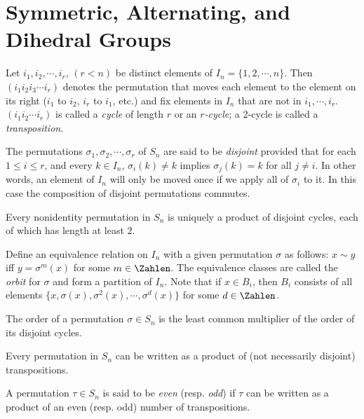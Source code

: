 \section{Symmetric, Alternating, and Dihedral Groups}
\begin{Definition}
	Let $ i_1,i_2,\cdots, i_r $, $ (r<n) $ be distinct elements of $ I_n=\{1,2,\cdots,n \} $. Then $ (i_1 i_2 i_3 \cdots i_r) $ denotes the permutation that moves each element to the element on its right ($ i_1 $ to $ i_2 $, $ i_r $ to $ i_1 $, etc.) and fix elements in $ I_n $ that are not in $ i_1 ,\cdots,i_r$. $ (i_1i_2 \cdots i_r) $ is called a \textit{cycle} of length $ r $ or an \textit{$ r $-cycle}; a $ 2 $-cycle is called a \textit{transposition}.
\end{Definition}
\begin{Definition}
	The permutations $ \sigma_1,\sigma_2,\cdots,\sigma_r $ of $ S_n $ are said to be \textit{disjoint} provided that for each $ 1\leqslant i \leqslant r $, and every $ k\in I_n $, $ \sigma_i(k)\neq k $ implies $ \sigma_j(k)=k $ for all $ j \neq i $. In other words, an element of $ I_n $ will only be moved once if we apply all of $ \sigma_i$ to it. In this case the composition of disjoint permutations commutes.
\end{Definition}
\begin{Theorem}
	Every nonidentity permutation in $ S_n $ is uniquely a product of disjoint cycles, each of which has length at least $ 2 $.
\end{Theorem}
\begin{Definition}
	Define an equivalence relation on $ I_n $ with a given permutation $ \sigma $ as follows: $ x \sim y $ iff $ y=\sigma^m(x) $ for some $ m \in \Zahlen $. The equivalence classes are called the \textit{orbit} for $ \sigma $ and form a partition of $ I_n $. Note that if $ x \in B_i $, then $ B_i $ consists of all elements $ \{x, \sigma(x),\sigma^2(x),\cdots,\sigma^d(x) \} $ for some $ d \in \Zahlen $.
\end{Definition}
\begin{Corollary}
	The order of a permutation $ \sigma \in S_n $ is the least common multiplier of the order of its disjoint cycles.
\end{Corollary}
\begin{Corollary}
	Every permutation in $ S_n $ can be written as a product of (not necessarily disjoint) transpositions.
\end{Corollary}
\begin{Definition}
	A permutation $ \tau \in S_n $ is said to be \textit{even} (resp. \textit{odd}) if $ \tau $ can be written as a product of an even (resp. odd) number of transpositions.
\end{Definition}
